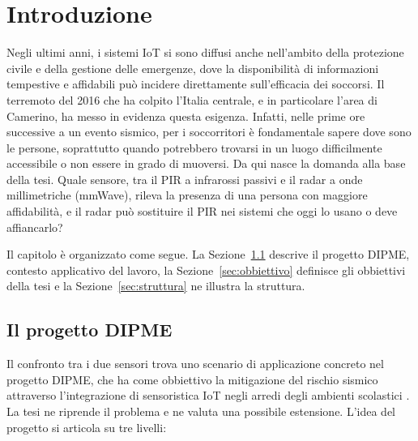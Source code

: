 \chapter{Introduzione}
\label{chap:intro}

Negli ultimi anni, i sistemi IoT si sono diffusi anche nell'ambito della protezione civile e della gestione delle emergenze, dove la disponibilità di informazioni tempestive e affidabili può incidere direttamente sull'efficacia dei soccorsi.
Il terremoto del 2016 che ha colpito l'Italia centrale, e in particolare l'area di Camerino, ha messo in evidenza questa esigenza. Infatti, nelle prime ore successive a un evento sismico, per i soccorritori è fondamentale sapere dove sono le persone, soprattutto quando potrebbero trovarsi in un luogo difficilmente accessibile o non essere in grado di muoversi. Da qui nasce la domanda alla base della tesi. Quale sensore, tra il PIR a infrarossi passivi e il radar a onde millimetriche (mmWave), rileva la presenza di una persona con maggiore affidabilità, e il radar può sostituire il PIR nei sistemi che oggi lo usano o deve affiancarlo?

Il capitolo è organizzato come segue. La Sezione~\ref{sec:dipme} descrive il progetto DIPME, contesto applicativo del lavoro, la Sezione~\ref{sec:obbiettivo} definisce gli obbiettivi della tesi e la Sezione~\ref{sec:struttura} ne illustra la struttura.


\section{Il progetto DIPME}
\label{sec:dipme}

Il confronto tra i due sensori trova uno scenario di applicazione concreto nel progetto DIPME, che ha come obbiettivo la mitigazione del rischio sismico attraverso l'integrazione di sensoristica IoT negli arredi degli ambienti scolastici \cite{slideDipme}. La tesi ne riprende il problema e ne valuta una possibile estensione. 
L'idea del progetto si articola su tre livelli:

